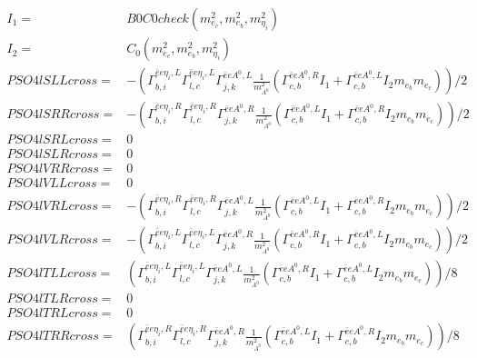 \documentclass[A4,landscape]{article}
\begin{document}
\begin{align} 
I_1= & B0C0check(m^2_{e_{{c}}}, m^2_{e_{{b}}}, m^2_{\eta_i}) \\ 
I_2= & C_0(m^2_{e_{{c}}}, m^2_{e_{{b}}}, m^2_{\eta_i}) \\ 
  PSO4lSLLcross= & -( \Gamma^{\bar{e}e \eta_i ,L}_{b, i} \Gamma^{\bar{e}e \eta_i ,L}_{l, c} \Gamma^{\bar{e}e A^0 ,L}_{j, k} \frac{1}{m^2_{A^0}} (\Gamma^{\bar{e}e A^0 ,R}_{c, b} I_1 + \Gamma^{\bar{e}e A^0 ,L}_{c, b} I_2 m_{e_{{b}}} m_{e_{{c}}}))/2 \\ 
  PSO4lSRRcross= & -( \Gamma^{\bar{e}e \eta_i ,R}_{b, i} \Gamma^{\bar{e}e \eta_i ,R}_{l, c} \Gamma^{\bar{e}e A^0 ,R}_{j, k} \frac{1}{m^2_{A^0}} (\Gamma^{\bar{e}e A^0 ,L}_{c, b} I_1 + \Gamma^{\bar{e}e A^0 ,R}_{c, b} I_2 m_{e_{{b}}} m_{e_{{c}}}))/2 \\ 
  PSO4lSRLcross= & 0 \\ 
  PSO4lSLRcross= & 0 \\ 
  PSO4lVRRcross= & 0 \\ 
  PSO4lVLLcross= & 0 \\ 
  PSO4lVRLcross= & -( \Gamma^{\bar{e}e \eta_i ,R}_{b, i} \Gamma^{\bar{e}e \eta_i ,R}_{l, c} \Gamma^{\bar{e}e A^0 ,L}_{j, k} \frac{1}{m^2_{A^0}} (\Gamma^{\bar{e}e A^0 ,L}_{c, b} I_1 + \Gamma^{\bar{e}e A^0 ,R}_{c, b} I_2 m_{e_{{b}}} m_{e_{{c}}}))/2 \\ 
  PSO4lVLRcross= & -( \Gamma^{\bar{e}e \eta_i ,L}_{b, i} \Gamma^{\bar{e}e \eta_i ,L}_{l, c} \Gamma^{\bar{e}e A^0 ,R}_{j, k} \frac{1}{m^2_{A^0}} (\Gamma^{\bar{e}e A^0 ,R}_{c, b} I_1 + \Gamma^{\bar{e}e A^0 ,L}_{c, b} I_2 m_{e_{{b}}} m_{e_{{c}}}))/2 \\ 
  PSO4lTLLcross= & ( \Gamma^{\bar{e}e \eta_i ,L}_{b, i} \Gamma^{\bar{e}e \eta_i ,L}_{l, c} \Gamma^{\bar{e}e A^0 ,L}_{j, k} \frac{1}{m^2_{A^0}} (\Gamma^{\bar{e}e A^0 ,R}_{c, b} I_1 + \Gamma^{\bar{e}e A^0 ,L}_{c, b} I_2 m_{e_{{b}}} m_{e_{{c}}}))/8 \\ 
  PSO4lTLRcross= & 0 \\ 
  PSO4lTRLcross= & 0 \\ 
  PSO4lTRRcross= & ( \Gamma^{\bar{e}e \eta_i ,R}_{b, i} \Gamma^{\bar{e}e \eta_i ,R}_{l, c} \Gamma^{\bar{e}e A^0 ,R}_{j, k} \frac{1}{m^2_{A^0}} (\Gamma^{\bar{e}e A^0 ,L}_{c, b} I_1 + \Gamma^{\bar{e}e A^0 ,R}_{c, b} I_2 m_{e_{{b}}} m_{e_{{c}}}))/8 \\ 
\end{align} 
\end{document}
